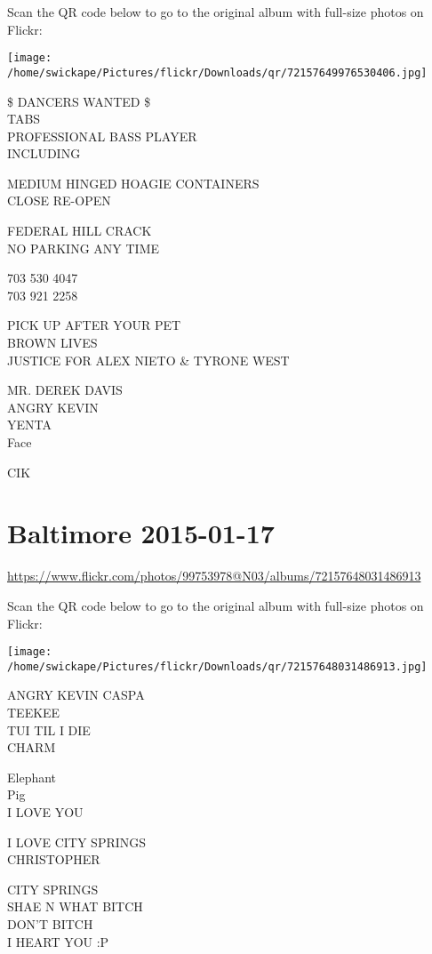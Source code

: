 \documentclass[10pt,letterpaper]{article}
\begin{document}
Scan the QR code below to go to the original album with full-size photos on Flickr:

\texttt{[image: /home/swickape/Pictures/flickr/Downloads/qr/72157649976530406.jpg]}
\pagebreak

\$ DANCERS WANTED \$\\
TABS\\
PROFESSIONAL BASS PLAYER\\
INCLUDING

MEDIUM HINGED HOAGIE CONTAINERS\\
CLOSE RE{-}OPEN

FEDERAL HILL CRACK\\
NO PARKING ANY TIME

703 530 4047\\
703 921 2258

PICK UP AFTER YOUR PET\\
BROWN LIVES\\
JUSTICE FOR ALEX NIETO \& TYRONE WEST

MR. DEREK DAVIS\\
ANGRY KEVIN\\
YENTA\\
Face

CIK
\pagebreak

\section*{Baltimore 2015-01-17}

\url{https://www.flickr.com/photos/99753978@N03/albums/72157648031486913}

Scan the QR code below to go to the original album with full-size photos on Flickr:

\texttt{[image: /home/swickape/Pictures/flickr/Downloads/qr/72157648031486913.jpg]}
\pagebreak

ANGRY KEVIN CASPA\\
TEEKEE\\
TUI TIL I DIE\\
CHARM

Elephant\\
Pig\\
I LOVE YOU

I LOVE CITY SPRINGS\\
CHRISTOPHER

CITY SPRINGS\\
SHAE N WHAT BITCH\\
DON'T BITCH\\
I HEART YOU :P
\end{document}

